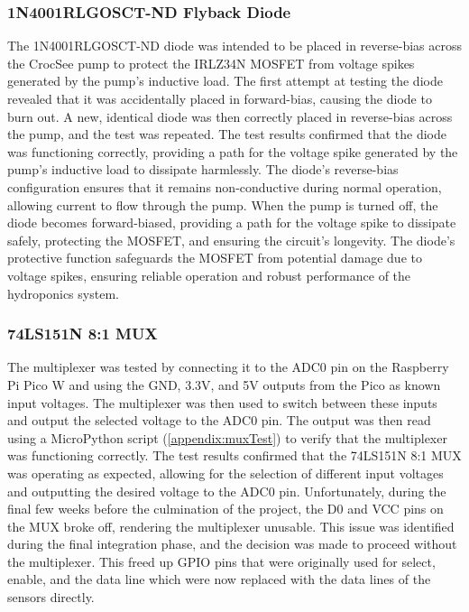 \documentclass[12pt]{article} %
\begin{document}
\subsubsection{1N4001RLGOSCT-ND Flyback Diode}
\noindent The 1N4001RLGOSCT-ND \cite{ref_diode} diode was intended to be placed in reverse-bias across the CrocSee pump to protect the IRLZ34N MOSFET from voltage spikes generated by the pump's inductive load. The first attempt at testing the diode revealed that it was accidentally placed in forward-bias, causing the diode to burn out. A new, identical diode was then correctly placed in reverse-bias across the pump, and the test was repeated. The test results confirmed that the diode was functioning correctly, providing a path for the voltage spike generated by the pump's inductive load to dissipate harmlessly. The diode's reverse-bias configuration ensures that it remains non-conductive during normal operation, allowing current to flow through the pump. When the pump is turned off, the diode becomes forward-biased, providing a path for the voltage spike to dissipate safely, protecting the MOSFET, and ensuring the circuit's longevity. The diode's protective function safeguards the MOSFET from potential damage due to voltage spikes, ensuring reliable operation and robust performance of the hydroponics system.
\subsubsection{74LS151N 8:1 MUX}
\noindent The multiplexer \cite{ref_mux} was tested by connecting it to the ADC0 pin on the Raspberry Pi Pico W and using the GND, 3.3V, and 5V outputs from the Pico as known input voltages. The multiplexer was then used to switch between these inputs and output the selected voltage to the ADC0 pin. The output was then read using a MicroPython script (\ref{appendix:muxTest}) to verify that the multiplexer was functioning correctly. The test results confirmed that the 74LS151N 8:1 MUX was operating as expected, allowing for the selection of different input voltages and outputting the desired voltage to the ADC0 pin.
\newline
\newline
\noindent Unfortunately, during the final few weeks before the culmination of the project, the D0 and VCC pins on the MUX broke off, rendering the multiplexer unusable. This issue was identified during the final integration phase, and the decision was made to proceed without the multiplexer. This freed up GPIO pins that were originally used for select, enable, and the data line which were now replaced with the data lines of the sensors directly. 
\end{document}
